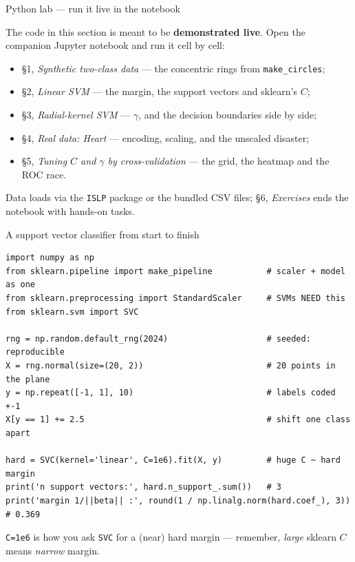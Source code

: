 \documentclass[aspectratio=169,11pt]{beamer}
\begin{document}
\begin{frame}{Python lab --- run it live in the notebook}
  \begin{labnote}
    The code in this section is meant to be \textbf{demonstrated live}. Open
    the companion Jupyter notebook and run it cell by cell:
    \begin{itemize}
      \item \S1, \emph{Synthetic two-class data} --- the concentric rings from
            \texttt{make\_circles};
      \item \S2, \emph{Linear SVM} --- the margin, the support vectors and
            sklearn's $C$;
      \item \S3, \emph{Radial-kernel SVM} --- $\gamma$, and the decision
            boundaries side by side;
      \item \S4, \emph{Real data: Heart} --- encoding, scaling, and the
            unscaled disaster;
      \item \S5, \emph{Tuning $C$ and $\gamma$ by cross-validation} --- the
            grid, the heatmap and the ROC race.
    \end{itemize}
    Data loads via the \texttt{ISLP} package or the bundled CSV files;
    \S6, \emph{Exercises} ends the notebook with hands-on tasks.
  \end{labnote}
\end{frame}

\begin{frame}[fragile]{A support vector classifier from start to finish}
  \begin{lstlisting}[basicstyle=\ttfamily\scriptsize]
import numpy as np
from sklearn.pipeline import make_pipeline           # scaler + model as one
from sklearn.preprocessing import StandardScaler     # SVMs NEED this
from sklearn.svm import SVC

rng = np.random.default_rng(2024)                    # seeded: reproducible
X = rng.normal(size=(20, 2))                         # 20 points in the plane
y = np.repeat([-1, 1], 10)                           # labels coded +-1
X[y == 1] += 2.5                                     # shift one class apart

hard = SVC(kernel='linear', C=1e6).fit(X, y)         # huge C ~ hard margin
print('n support vectors:', hard.n_support_.sum())   # 3
print('margin 1/||beta|| :', round(1 / np.linalg.norm(hard.coef_), 3))  # 0.369
  \end{lstlisting}
  \begin{takeaway}
    \texttt{C=1e6} is how you ask \texttt{SVC} for a (near) hard margin ---
    remember, \emph{large} sklearn $C$ means \emph{narrow} margin.
  \end{takeaway}
\end{frame}
\end{document}
